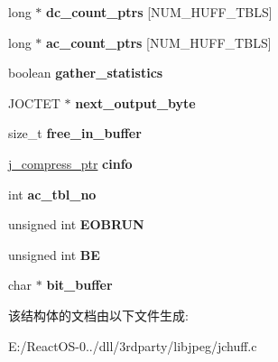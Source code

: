 \begin{DoxyCompactItemize}
long $\ast$ {\bfseries dc\+\_\+count\+\_\+ptrs} \mbox{[}N\+U\+M\+\_\+\+H\+U\+F\+F\+\_\+\+T\+B\+LS\mbox{]}
\item 
\mbox{\label{structhuff__entropy__encoder_acc141b7e17ee817d92b9340d603dde9e}} 
long $\ast$ {\bfseries ac\+\_\+count\+\_\+ptrs} \mbox{[}N\+U\+M\+\_\+\+H\+U\+F\+F\+\_\+\+T\+B\+LS\mbox{]}
\item 
\mbox{\label{structhuff__entropy__encoder_ac32b3f950c2755e14bdcdbb9d5c83c82}} 
boolean {\bfseries gather\+\_\+statistics}
\item 
\mbox{\label{structhuff__entropy__encoder_ad7be281727ae2a6488c8b37b017c1f40}} 
J\+O\+C\+T\+ET $\ast$ {\bfseries next\+\_\+output\+\_\+byte}
\item 
\mbox{\label{structhuff__entropy__encoder_af8e2d1d3eb92b83376c1b6e194e54660}} 
size\+\_\+t {\bfseries free\+\_\+in\+\_\+buffer}
\item 
\mbox{\label{structhuff__entropy__encoder_a46ddb16b709ccae209e295480f2d38b6}} 
\hyperlink{structjpeg__compress__struct}{j\+\_\+compress\+\_\+ptr} {\bfseries cinfo}
\item 
\mbox{\label{structhuff__entropy__encoder_a43f8a73e36740cd79fde6e45efef6d16}} 
int {\bfseries ac\+\_\+tbl\+\_\+no}
\item 
\mbox{\label{structhuff__entropy__encoder_aeec45e042ccea57047e6a7dad5470f2b}} 
unsigned int {\bfseries E\+O\+B\+R\+UN}
\item 
\mbox{\label{structhuff__entropy__encoder_a60927ee1fdfb068cb003c17587770a2b}} 
unsigned int {\bfseries BE}
\item 
\mbox{\label{structhuff__entropy__encoder_adc619a5c8cb0398b78fb015c618ffdea}} 
char $\ast$ {\bfseries bit\+\_\+buffer}
\end{DoxyCompactItemize}


该结构体的文档由以下文件生成\+:\begin{DoxyCompactItemize}
\item 
E\+:/\+React\+O\+S-\/0../dll/3rdparty/libjpeg/jchuff.\+c\end{DoxyCompactItemize}
